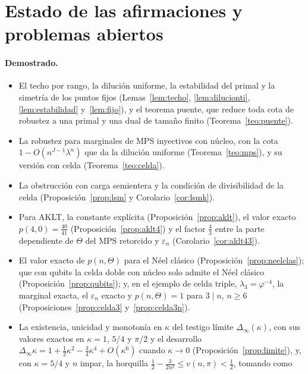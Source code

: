\documentclass[11pt,a4paper]{article}
\theoremstyle{remark}
\begin{document}
\section{Estado de las afirmaciones y problemas abiertos}\label{sec:conclusiones}

\paragraph{Demostrado.}
\begin{itemize}
\item El techo por rango, la dilución uniforme, la estabilidad del primal y la simetría de los
  puntos fijos (Lemas~\ref{lem:techo}, \ref{lem:dilucionti}, \ref{lem:estabilidad}
  y~\ref{lem:fijo}), y el teorema puente, que reduce toda cota de robustez a una primal y una dual
  de tamaño finito (Teorema~\ref{teo:puente}).
\item La robustez para marginales de MPS inyectivos con núcleo, con la cota
  $1-O(n^{J-1}\lambda^n)$ que da la dilución uniforme (Teorema~\ref{teo:mps}), y su versión con
  celda (Teorema~\ref{teo:celda}).
\item La obstrucción con carga semientera y la condición de divisibilidad de la celda
  (Proposición~\ref{prop:lsm} y Corolario~\ref{cor:lsmk}).
\item Para AKLT, la constante explícita (Proposición~\ref{prop:aklt}), el valor exacto
  $p(4,0)=\tfrac{40}{41}$ (Proposición~\ref{prop:aklt4}) y el factor $\tfrac43$ entre la parte
  dependiente de $\Theta$ del MPS retorcido y $\varepsilon_n$ (Corolario~\ref{cor:aklt43}).
\item El valor exacto de $p(n,\Theta)$ para el Néel clásico (Proposición~\ref{prop:neelclas}); que
  con qubits la celda doble con núcleo solo admite el Néel clásico (Proposición~\ref{prop:qubits});
  y, en el ejemplo de celda triple, $\lambda_3=\varphi^{-4}$, la marginal exacta, el $\varepsilon_n$
  exacto y $p(n,\Theta)=1$ para $3\mid n$, $n\ge6$ (Proposiciones~\ref{prop:celda3}
  y~\ref{prop:celda3n}).
\item La existencia, unicidad y monotonía en $\kappa$ del testigo límite $\Delta_\infty(\kappa)$,
  con sus valores exactos en $\kappa=1$, $5/4$ y $\pi/2$ y el desarrollo
  $\Delta_\infty\kappa=1+\tfrac12\kappa^2-\tfrac34\kappa^4+O(\kappa^6)$ cuando $\kappa\to0$
  (Proposición~\ref{prop:limite}), y, con
  $\kappa=5/4$ y $n$ impar, la horquilla $\tfrac12-\tfrac3{2n^2}\le v(n,\pi)<\tfrac12$, tomando como

\end{itemize}
\end{document}
